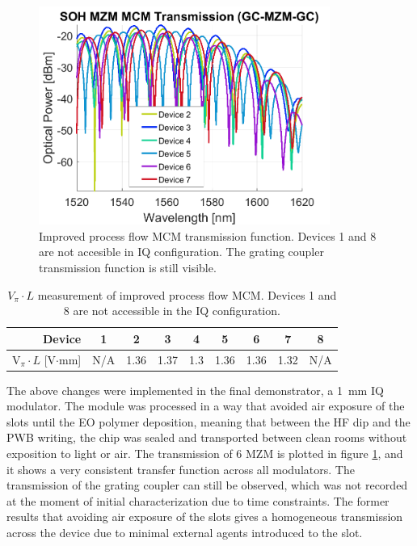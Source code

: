 \begin{figure}[!ht]
\centering
  \includegraphics[width=0.85\textwidth]{figs/MCM4/MCM4_IL_measured_demo004}
  \caption{Improved process flow MCM transmission function. Devices 1 and 8 are not accesible in IQ configuration. The grating coupler transmission function is still visible.}
  \label{fig:MCM4_TX}
\end{figure}

\begin{table}[]
\centering
\begin{tabular}{@{}rrrrrrrrr@{}}
\toprule
Device                        & \multicolumn{1}{c}{1} & \multicolumn{1}{c}{2} & \multicolumn{1}{c}{3} & \multicolumn{1}{c}{4} & \multicolumn{1}{c}{5} & \multicolumn{1}{c}{6} & \multicolumn{1}{c}{7} & \multicolumn{1}{c}{8} \\ \midrule
V$_\pi \cdot L$ {[}V$\cdot$mm{]} & N/A                  & 1.36                  & 1.37                 & 1.3                  & 1.36                  & 1.36                  & 1.32                  & N/A                  \\ \bottomrule
\end{tabular}
\caption{$V_\pi \cdot L$ measurement of improved process flow MCM. Devices 1 and 8 are not accessible in the IQ configuration.}
\label{tab:MCM2_sum}
\end{table}

The above changes were implemented in the final demonstrator, a \SI{1}{\milli\meter} IQ modulator. The module was processed in a way that avoided air exposure of the slots until the EO polymer deposition, meaning that between the HF dip and the PWB writing, the chip was sealed and transported between clean rooms without exposition to light or air. The transmission of 6 MZM is plotted in figure \ref{fig:MCM4_TX}, and it shows a very consistent transfer function across all modulators. The transmission of the grating coupler can still be observed, which was not recorded at the moment of initial characterization due to time constraints. The former results  that avoiding air exposure of the slots gives a homogeneous transmission across the device due to minimal external agents introduced to the slot.



